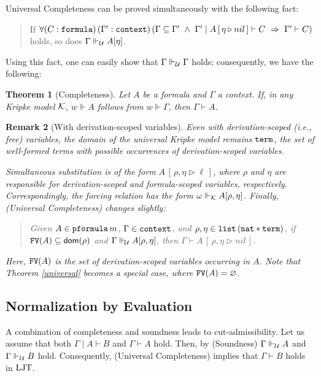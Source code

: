 \documentclass{svjour3}                     %
\newtheorem{thm}{Theorem}%
\newtheorem{rem}[thm]{Remark}
\newcommand{\calk}{{\cal K}}
\newcommand{\calu}{{\cal U}}
\newcommand{\To}{\,\,\Rightarrow\,\,}
\newcommand{\Ga}{\Gamma}
\newcommand{\om}{\omega}
\newcommand{\vd}{\vdash}
\newcommand{\Vd}{\Vdash}
\newcommand{\substa}[3]{#1\,[\,#2 \triangleright #3\,]}
\newcommand{\tm}{\subseteq}
\newcommand{\dom}{\mathrm{\textsf{dom}}}
\newcommand{\tnat}{\textup{\tt nat}}
\newcommand{\tpfml}{\textup{\tt pformula}}
\newcommand{\tterm}{\textup{\tt term}}
\newcommand{\tfml}{\textup{\tt formula}}
\newcommand{\tcontext}{\textup{\tt context}}
\newcommand{\tFV}{\textup{\tt FV}}
\newcommand{\tlist}{\textup{\tt list}}
\newcommand{\ljt}{\textup{LJT}}
\begin{document}
\noindent Universal Completeness can be proved simultaneously with the following fact:
\begin{quote}
  If  $\forall (C : \tfml)\, (\Ga' : \tcontext)\, (\Ga \tm \Ga' \,\, \wedge\,\, \Ga' \mid \substa{A}{\eta}{nil} \vd C \To \Ga' \vd C)$ holds,
  so does $\Ga \Vd_\calu A [\eta]$.  
\end{quote}
Using this fact, one can easily show that $\Ga \Vd_\calu \Ga$ holds; consequently, we have the following:

\begin{thm}[Completeness]\label{completeness}
  Let $A$ be a formula and $\Ga$ a context. If, in any Kripke model $\calk$, $w \Vd A$ follows from $w \Vd \Ga$, then $\Ga \vd A$.
\end{thm}

\begin{rem}[With derivation-scoped variables]\label{var-cpltness}
  Even with derivation-scoped (i.e., free) variables, the domain of the universal Kripke model remains $\tterm$, the set of well-formed terms with possible occurrences of derivation-scoped variables.

  Simultaneous substitution is of the form $\substa{A}{\rho,\eta}{\ell}$, where $\rho$ and $\eta$ are responsible for derivation-scoped and formula-scoped variables, respectively. Correspondingly, the forcing relation has the form $\om \Vd_\calk A [\rho, \eta]$. Finally, (Universal Completeness) changes slightly:
  \begin{quote}
    Given $A \in \tpfml\, m$, $\Ga \in \tcontext$, and $\rho, \eta \in \tlist\, (\tnat \ast \tterm)$, if $\tFV (A)\subseteq \dom (\rho)$ and $\Ga \Vd_{\!\calu} A [\rho,\eta]$, then $\Ga \vd  \substa{A}{\rho, \eta}{nil}$.    
  \end{quote}
Here, $\tFV(A)$ is the set of derivation-scoped variables occurring in $A$. Note that Theorem \ref{universal} becomes a special case, where $\tFV(A) = \varnothing$.
\end{rem}

\subsection{Normalization by Evaluation}
A combination of completeness and soundness leads to cut-admissibility. Let us assume that both $\Ga \mid A \vd B$ and $\Ga \vd A$ hold. Then, by (Soundness) $\Ga \Vd_\calu A$ and $\Ga \Vd_\calu B$ hold. Consequently, (Universal Completeness) implies that $\Ga \vd B$ holds in $\ljt$.
\end{document}
